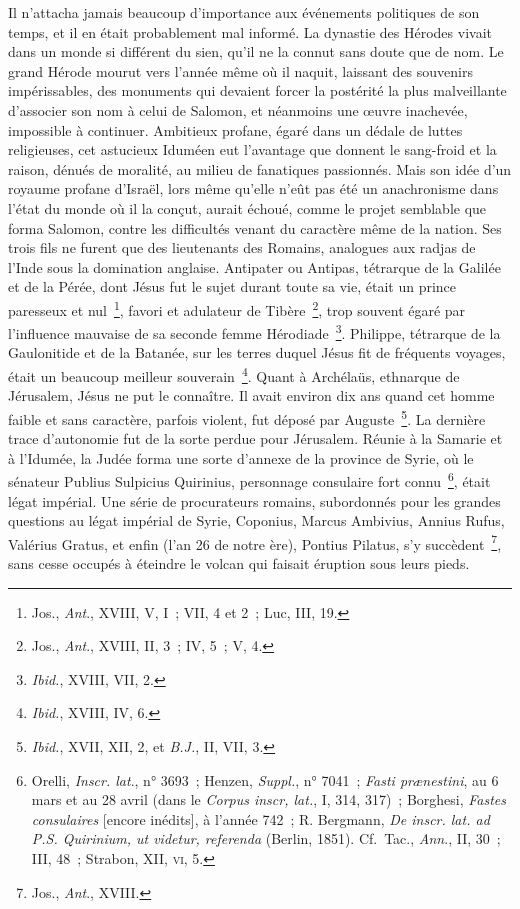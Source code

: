 \documentclass[french,twoside]{book} %
\begin{document}
Il n’attacha jamais beaucoup d’importance aux événements politiques de son temps, et il en était probablement mal informé. La dynastie des Hérodes vivait dans un monde si différent du sien, qu’il ne la connut sans doute que de nom. Le grand Hérode mourut vers l’année même où il naquit, laissant des souvenirs impérissables, des monuments qui devaient forcer la postérité la plus malveillante d’associer son nom à celui de Salomon, et néanmoins une œuvre inachevée, impossible à continuer. Ambitieux profane, égaré dans un dédale de luttes religieuses, cet astucieux Iduméen eut l’avantage que donnent le sang-froid et la raison, dénués de moralité, au milieu de fanatiques passionnés. Mais son idée d’un royaume profane d’Israël, lors même qu’elle n’eût pas été un anachronisme dans l’état du monde où il la conçut, aurait échoué, comme le projet semblable que forma Salomon, contre les difficultés venant du caractère même de la nation. Ses trois fils ne furent que des lieutenants des Romains, analogues aux radjas de l’Inde sous la domination anglaise. Antipater ou Antipas, tétrarque de la Galilée et de la Pérée, dont Jésus fut le sujet durant toute sa vie, était un prince paresseux et nul \footnote{ Jos., {\itshape Ant}., XVIII, V, I ; VII, 4 et 2 ; Luc, III, 19.}, favori et adulateur de Tibère \footnote{ Jos., {\itshape Ant}., XVIII, II, 3 ; IV, 5 ; V, 4.}, trop souvent égaré par l’influence mauvaise de sa seconde femme Hérodiade \footnote{{\itshape Ibid.}, XVIII, VII, 2.}. Philippe, tétrarque de la Gaulonitide et de la Batanée, sur les terres duquel Jésus fit de fréquents voyages, était un beaucoup meilleur souverain \footnote{{\itshape Ibid.}, XVIII, IV, 6.}. Quant à Archélaüs, ethnarque de Jérusalem, Jésus ne put le connaître. Il avait environ dix ans quand cet homme faible et sans caractère, parfois violent, fut déposé par Auguste \footnote{{\itshape Ibid.}, XVII, XII, 2, et {\itshape B.J.}, II, VII, 3.}. La dernière trace d’autonomie fut de la sorte perdue pour Jérusalem. Réunie à la Samarie et à l’Idumée, la Judée forma une sorte d’annexe de la province de Syrie, où le sénateur Publius Sulpicius Quirinius, personnage consulaire fort connu \footnote{ Orelli, {\itshape Inscr. lat}., n° 3693 ; Henzen, {\itshape Suppl.}, n° 7041 ; {\itshape Fasti prænestini}, au 6 mars et au 28 avril (dans le {\itshape Corpus inscr, lat.}, I, 314, 317) ; Borghesi, {\itshape Fastes consulaires} [encore inédits], à l’année 742 ; R. Bergmann, {\itshape De inscr. lat. ad P.S. Quirinium, ut videtur, referenda} (Berlin, 1851). Cf. Tac., {\itshape Ann}., II, 30 ; III, 48 ; Strabon, XII, \textsc{vi}, 5.}, était légat impérial. Une série de procurateurs romains, subordonnés pour les grandes questions au légat impérial de Syrie, Coponius, Marcus Ambivius, Annius Rufus, Valérius Gratus, et enfin (l’an 26 de notre ère), Pontius Pilatus, s’y succèdent \footnote{ Jos., {\itshape Ant}., XVIII.}, sans cesse occupés à éteindre le volcan qui faisait éruption sous leurs pieds.\par
\end{document}
